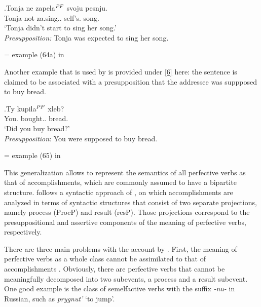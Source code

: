 \exg.\label{5}Tonja ne zapela$^{\mathit{PF}}$ svoju pesnju.\\
Tonja not za.sing.. self's. song.\\
\vspace{0.5em}
`Tonja didn't start to sing her song.'\\
\textit{Presupposition:} Tonja was expected to sing her song.
 \begin{flushright}
\vspace{-0.5em}	
= example (64a) in \citealt[29]{Romanova:06}
\end{flushright}

Another example that is used by \citet{Romanova:06} is provided under \ref{6} here: the sentence is claimed to be associated with a presupposition that the addressee was suppposed to buy bread.

\exg.\label{6}Ty kupila$^{\mathit{PF}}$ xleb?\\
You. bought.. bread.\\
\vspace{0.5em}
`Did you buy bread?'\\
\textit{Presupposition}: You were supposed to buy bread.\\
 \begin{flushright}
\vspace{-0.5em}
= example (65) in \citealt[30]{Romanova:06}
\end{flushright}

This generalization allows \citet{Romanova:06} to represent the semantics of all perfective verbs as that of accomplishments, which are commonly assumed to have a bipartite structure. \citet{Romanova:06} follows a syntactic approach of \citet{Ramchand:04}, on which accomplishments are analyzed in terms of syntactic structures that consist of two separate projections, namely process (ProcP) and result (resP). Those projections correspond to the presuppositional and assertive components of the meaning of perfective verbs, respectively. 

There are three main problems with the account by \citet{Romanova:06}. First, the meaning of perfective verbs as a whole class cannot be assimilated to that of accomplishments \citep[for counterarguments see][]{Filip:00, FilipRothstein:05}. Obviously, there are perfective verbs that cannot be meaningfully decomposed into two subevents, a process and a result subevent. One good example is the class of semelfactive verbs with the suffix \textit{-nu-} in Russian, such as \textit{prygnut'} `to jump'. 

